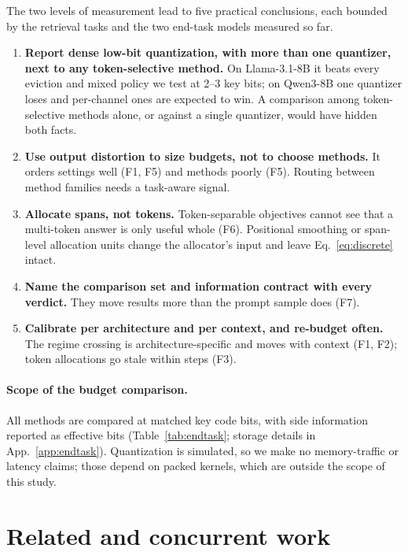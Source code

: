 \documentclass{article}
\theoremstyle{definition}
\begin{document}
The two levels of measurement lead to five practical conclusions, each bounded by the retrieval tasks and the two end-task models measured so far.
\begin{enumerate}[leftmargin=*,itemsep=1pt,topsep=2pt]
  \item \textbf{Report dense low-bit quantization, with more than one quantizer, next to any token-selective method.}  On Llama-3.1-8B it beats every eviction and mixed policy we test at 2--3 key bits; on Qwen3-8B one quantizer loses and per-channel ones are expected to win.  A comparison among token-selective methods alone, or against a single quantizer, would have hidden both facts.
  \item \textbf{Use output distortion to size budgets, not to choose methods.}  It orders settings well (F1, F5) and methods poorly (F5).  Routing between method families needs a task-aware signal.
  \item \textbf{Allocate spans, not tokens.}  Token-separable objectives cannot see that a multi-token answer is only useful whole (F6).  Positional smoothing or span-level allocation units change the allocator's input and leave Eq.~\ref{eq:discrete} intact.
  \item \textbf{Name the comparison set and information contract with every verdict.}  They move results more than the prompt sample does (F7).
  \item \textbf{Calibrate per architecture and per context, and re-budget often.}  The regime crossing is architecture-specific and moves with context (F1, F2); token allocations go stale within steps (F3).
\end{enumerate}

\paragraph{Scope of the budget comparison.}  All methods are compared at matched key code bits, with side information reported as effective bits (Table~\ref{tab:endtask}; storage details in App.~\ref{app:endtask}).  Quantization is simulated, so we make no memory-traffic or latency claims; those depend on packed kernels, which are outside the scope of this study.

\section{Related and concurrent work}
\label{sec:related}
\end{document}
